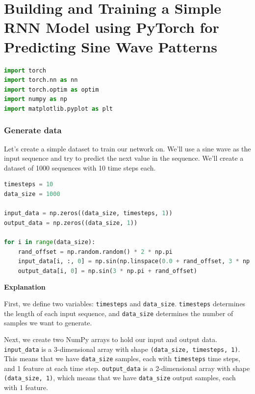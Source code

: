 \section{Building and Training a Simple RNN Model using PyTorch for
Predicting Sine Wave
Patterns}\label{building-and-training-a-simple-rnn-model-using-pytorch-for-predicting-sine-wave-patterns}

\begin{lstlisting}[language=Python]
import torch
import torch.nn as nn
import torch.optim as optim
import numpy as np
import matplotlib.pyplot as plt
\end{lstlisting}

\subsubsection{Generate data}\label{generate-data}

Let's create a simple dataset to train our network on. We'll use a sine
wave as the input sequence and try to predict the next value in the
sequence. We'll create a dataset of 1000 sequences with 10 time steps
each.

\begin{lstlisting}[language=Python]
timesteps = 10
data_size = 1000

input_data = np.zeros((data_size, timesteps, 1))
output_data = np.zeros((data_size, 1))

for i in range(data_size):
    rand_offset = np.random.random() * 2 * np.pi
    input_data[i, :, 0] = np.sin(np.linspace(0.0 + rand_offset, 3 * np.pi + rand_offset, num=timesteps))
    output_data[i, 0] = np.sin(3 * np.pi + rand_offset)
\end{lstlisting}

\textbf{Explanation}

First, we define two variables: \lstinline{timesteps} and
\lstinline{data_size}.
\lstinline{timesteps} determines the length of each input sequence, and \lstinline{data_size} determines the number of samples we want to generate.\newline

Next, we create two NumPy arrays to hold our input and output data.
\lstinline{input_data} is a 3-dimensional array with
shape \lstinline{(data_size, timesteps, 1)}. This means
that we have \lstinline{data_size} samples, each with
\lstinline{timesteps} time steps, and 1 feature at each
time step. \lstinline{output_data} is a 2-dimensional
array with shape \lstinline{(data_size, 1)}, which means
that we have \lstinline{data_size} output samples, each
with 1 feature. \newline

